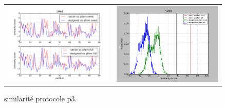 \documentclass[a4paper,12pt]{article}
\begin{document}
\begin{figure}[t]
\begin{tabular}{cc}
       \includegraphics[width=8.45cm]{gen_08032012/1M61/p3/graph_simil_bypos.png} &
       \includegraphics[width=8.45cm]{gen_08032012/1M61/p3/graph_simil_byseq.png} \\


     \end{tabular}

     \caption{similarité protocole p3.}
   \end{figure}
\end{document}

